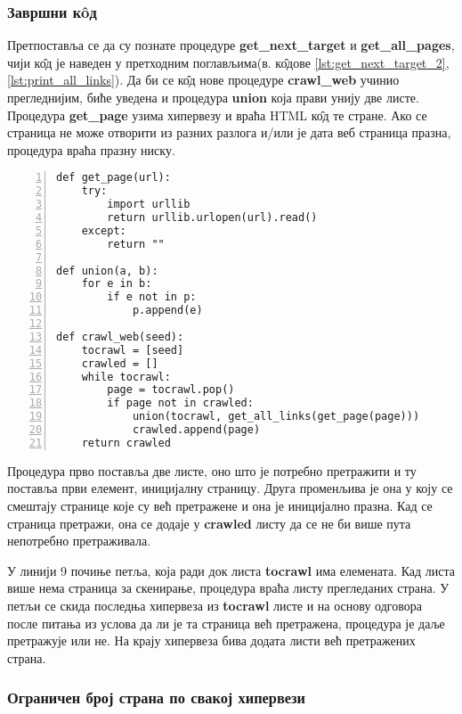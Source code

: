 \subsubsection{Завршни к\^oд}

Претпоставља се да су познате процедуре \textbf{get\_next\_target} и \textbf{get\_all\_pages}, чији к\^{о}д је наведен у претходним поглављима(в. к\^{о}дове \ref{lst:get_next_target_2}, \ref{lst:print_all_links}). Да би се к\^{о}д нове процедуре \textbf{crawl\_web} учинио прегледнијим, биће уведена и процедура \textbf{union} која прави унију две листе. Процедура \textbf{get\_page}  узима хипервезу и враћа HTML к\^{о}д те стране. Ако се страница не може отворити из разних разлога и/или је дата веб страница празна, процедура враћа празну ниску.

\begin{lstlisting}[caption=Веб паук, label={lst:crawlweb1}, numbers=left]
def get_page(url):
    try:
        import urllib
        return urllib.urlopen(url).read()
    except:
        return ""

def union(a, b):
    for e in b:
        if e not in p:
            p.append(e)

def crawl_web(seed):
    tocrawl = [seed]
    crawled = []
    while tocrawl:
        page = tocrawl.pop()
        if page not in crawled:
            union(tocrawl, get_all_links(get_page(page)))
            crawled.append(page)
    return crawled
\end{lstlisting}

Процедура прво поставља две листе, оно што је потребно претражити и ту поставља први елемент, иницијалну страницу. Друга променљива је она у коју се смештају странице које су већ претражене и она је иницијално празна. Кад се страница претражи, она се додаје у \textbf{crawled} листу да се не би више пута непотребно претраживала.

У линији 9 почиње петља, која ради док листа \textbf{tocrawl} има елемената. Кад листа више нема страница за скенирање, процедура враћа листу прегледаних страна. У петљи се скида последња хипервеза из \textbf{tocrawl} листе и на основу одговора после питања из услова да ли је та страница већ претражена, процедура је даље претражује или не. На крају хипервеза бива додата листи већ претражених страна.

\subsubsection{Ограничен број страна по свакој хипервези}

